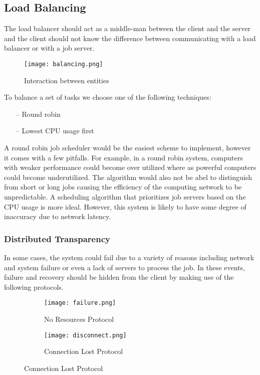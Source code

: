 \documentclass[12pt, oneside,english]{article}
\begin{document}
    \subsection{Load Balancing}\label{subsec:balancing}

    The load balancer should act as a middle-man between the client and the server
    and the client should not know the difference between communicating with
    a load balancer or with a job server.


    \begin{figure}[H]
        \centering
        \texttt{[image: balancing.png]}
        \caption{Interaction between entities}
    \end{figure}

    To balance a set of tasks we choose one of the following techniques:

    \begin{itemize}
        \item[--] Round robin
        \item[--] Lowest CPU usage first
    \end{itemize}

    A round robin job scheduler would be the easiest scheme to implement, however
    it comes with a few pitfalls.
    For example, in a round robin system, computers with weaker performance could
    become over utilized where as powerful computers could become underutilized.
    The algorithm would also not be abel to distinguish from short or long jobs
    causing the efficiency of the computing network to be unpredictable.
    A scheduling algorithm that prioritizes job servers based on the CPU usage
    is more ideal.
    However, this system is likely to have some degree of inaccuracy due to network
    latency.

    \subsubsection{Distributed Transparency}

    In some cases, the system could fail due to a variety of reasons including
    network and system failure or even a lack of servers to process the job.
    In these events, failure and recovery should be hidden from the client
    by making use of the following protocols.

    \begin{figure}[H]
        \begin{subfigure}{.5\textwidth}
            \centering
            \texttt{[image: failure.png]}
            \caption{No Resources Protocol}
        \end{subfigure}
        \begin{subfigure}{.5\textwidth}
            \centering
            \texttt{[image: disconnect.png]}
            \caption{Connection Lost Protocol}
        \end{subfigure}
    \end{figure}
\end{document}
